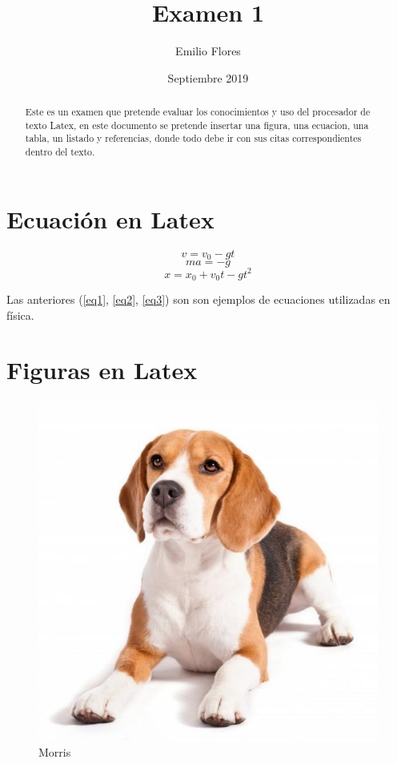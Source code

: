 \documentclass{article}
\title{Examen 1}
\author{Emilio Flores }
\date{Septiembre 2019}
\begin{document}
\maketitle
\begin{abstract}
    Este es un examen que pretende evaluar los conocimientos y uso del procesador de texto Latex, en este documento se pretende insertar una figura, una ecuacion, una tabla, un listado y referencias, donde todo debe ir con sus citas correspondientes dentro del texto.
\end{abstract}

\section*{Ecuación en Latex}
\begin{equation}
    v=v_0 - gt
    \label{eq1}
\end{equation}
\begin{equation}
    ma=-g
    \label{eq2}
\end{equation}
\begin{equation}
    x=x_0 + v_0t - gt^2
    \label{eq3}
\end{equation}

Las anteriores (\ref{eq1}, \ref{eq2}, \ref{eq3}) son son ejemplos de ecuaciones utilizadas en física.

\section*{Figuras en Latex}
\begin{figure}[H]
    \centering
    \includegraphics[scale=0.3]{fig1.png}
    \caption{Morris\label{fig1}}
    \end{figure}
    
\end{document}
